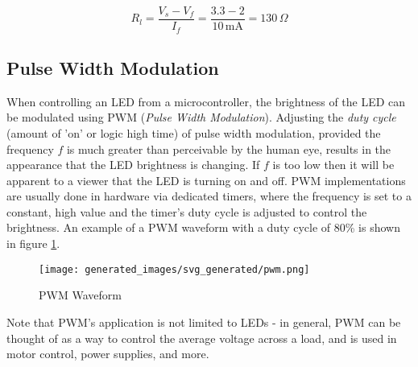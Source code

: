 \documentclass[main.tex]{subfiles}
\begin{document}

\begin{equation}
    R_l = \frac{V_s - V_f}{I_f} = \frac{3.3-2}{10\,\text{mA}} = 130 \,\Omega
    \label{eq:led_current_limitting_resistor}
\end{equation}


\subsection{Pulse Width Modulation}
When controlling an LED from a microcontroller, the brightness of the LED can be modulated using PWM (\textit{Pulse Width Modulation}). Adjusting the \textit{duty cycle} (amount of 'on' or logic high time) of pulse width modulation, provided the frequency $f$ is much greater than perceivable by the human eye, results in the appearance that the LED brightness is changing. If $f$ is too low then it will be apparent to a viewer that the LED is turning on and off. PWM implementations are usually done in hardware via dedicated timers, where the frequency is set to a constant, high value and the timer's duty cycle is adjusted to control the brightness. An example of a PWM waveform with a duty cycle of 80\% is shown in figure \ref{fig:pwm_waveform}.

\begin{figure}[H]
    \centering
    \texttt{[image: generated\_images/svg\_generated/pwm.png]}
    \caption{PWM Waveform}
    \label{fig:pwm_waveform}
\end{figure}

\noindent Note that PWM's application is not limited to LEDs - in general, PWM can be thought of as a way to control the average voltage across a load, and is used in motor control, power supplies, and more.
\end{document}

